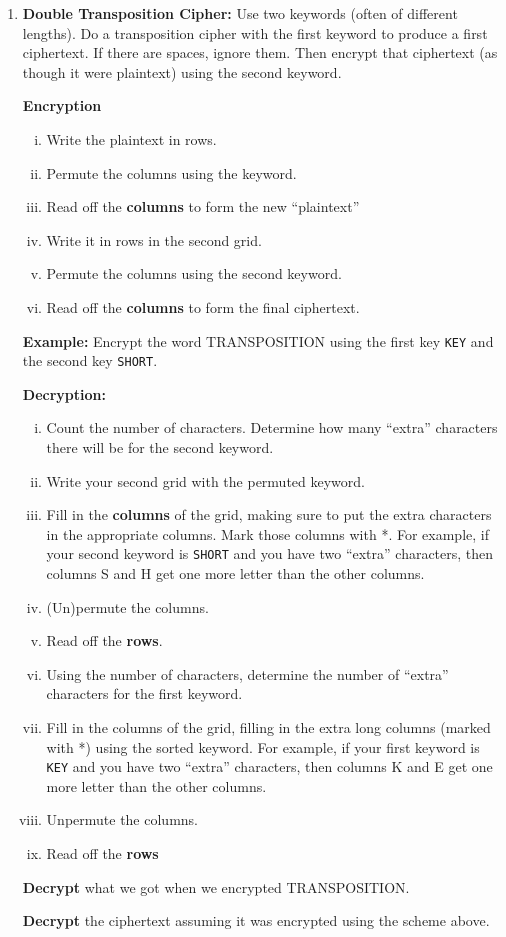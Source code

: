 \documentclass[12pt]{article}
\renewcommand{\emph}[1]{\textsf{\textbf{#1}}}
\newcommand{\be}{\begin{enumerate}}
\newcommand{\ee}{\end{enumerate}}
\begin{document}
\begin{enumerate}
\item \emph{Double Transposition Cipher:} Use two keywords (often of different lengths). Do a transposition cipher with the first keyword to produce a first ciphertext. If there are spaces, ignore them. Then encrypt that ciphertext (as though it were plaintext) using the second keyword.

\emph{Encryption}

\be[i.]
\item Write the plaintext in rows.
\item Permute the columns using the keyword.
\item Read off the \emph{columns} to form the new ``plaintext'' 
\item Write it in rows in the second grid.
\item Permute the columns using the second keyword.
\item Read off the \emph{columns} to form the final ciphertext.
\ee


\emph{Example:} Encrypt the word TRANSPOSITION using the first key {\tt KEY} and the second key {\tt SHORT}.


\newpage


\emph{Decryption:}

\be[i.]
\item Count the number of characters. Determine how many ``extra'' characters there will be for the second keyword. 
\item Write your second grid with the permuted keyword. 
\item Fill in the \emph{columns} of the grid, making sure to put the extra characters in the appropriate columns. Mark those columns with *. For example, if your second keyword is {\tt SHORT} and you have two ``extra'' characters, then columns S and H get one more letter than the other columns.
\item (Un)permute the columns.
\item Read off the {\bf rows}.
\item Using the number of characters, determine the number of ``extra'' characters for the first keyword.
\item Fill in the columns of the grid, filling in the extra long columns (marked with *) using the sorted keyword. For example, if your first keyword is {\tt KEY} and you have two ``extra'' characters, then columns K and E get one more letter than the other columns.
\item Unpermute the columns.
\item Read off the {\bf rows}
\ee


\emph{Decrypt} what we got when we encrypted TRANSPOSITION.


\vfill


\emph{Decrypt} the ciphertext  assuming it was encrypted using the scheme above.

\vfill



\end{enumerate}
\end{document}
